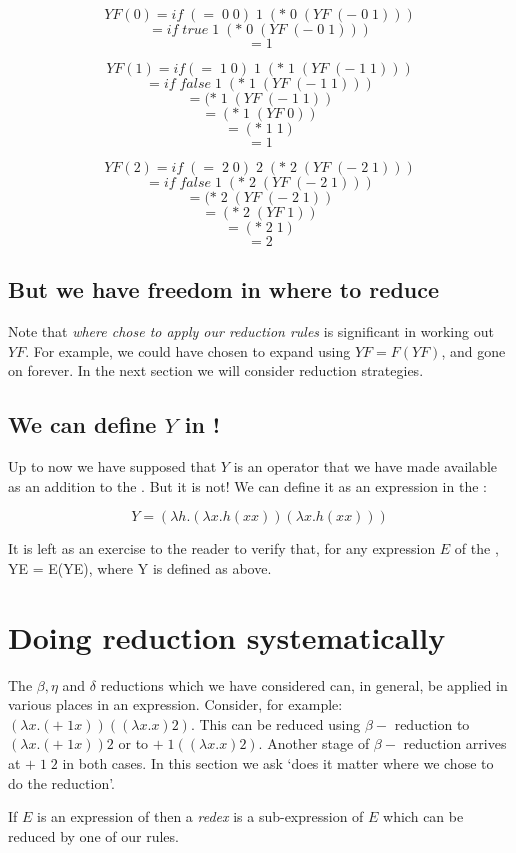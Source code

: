 $$YF(0) =  if\;(=\;0\;0)\;1\;(*\;0\;(YF\;(-\;0\;1)))$$
$$  =    if\;true\;1\;(*\;0\;(YF\;(-\;0\;1)))$$
$$ = 1 $$


$$YF(1) =  if (=\;1\;0)\;1\;(*\;1\;(YF\;(-\;1\;1)))$$
$$  =    if\;false\;1\;(*\;1\;(YF\;(-\;1\;1)))$$
$$ =      (*\;1\;(YF\;(-\;1\;1)) $$
$$ =      (*\;1\;(YF\;0)) $$
$$ =      (*\;1\;1) $$
$$ =        1 $$


$$YF(2) =  if\;(=\;2\;0)\;2\;(*\;2\;(YF\;(-\;2\;1)))$$
$$  =    if\;false\;1\;(*\;2\;(YF\;(-\;2\;1)))$$
$$ =      (*\;2\;(YF\;(-\;2\;1)) $$
$$ =      (*\;2\;(YF\;1)) $$
$$ =      (*\;2\;1) $$
$$ =        2 $$

\subsection{But we have freedom in where to reduce}
Note that {\em where chose to apply our reduction rules} is significant
in working out $YF$. For example, we could have chosen to expand using
$YF = F(YF)$, and gone on forever. In the next section we will consider
reduction strategies.

\subsection{We can define $Y$ in \LC!}
Up to now we have supposed that $Y$ is an operator that we have made
available as an addition to the \LC. But it is not! We can define it as an
expression in the \LC:

$$ Y = (\lambda h. (\lambda x.h (x x)) (\lambda x.h (x x)))$$

It is left as an exercise to the reader to verify that, for any expression
$E$ of the \LC, YE = E(YE), where Y is defined as above.


\section{Doing reduction systematically}

The $\beta, \eta$ and $\delta$ reductions which we have considered can,
in general, be applied in various places in an expression. Consider, for
example: $(\lambda x.(+\;1 x))((\lambda x.x)2)$. This can be reduced using
$\beta-$ reduction to $(\lambda x.(+\;1 x))2$ or to $+\;1 ((\lambda
x.x)2)$. Another stage of  $\beta-$ reduction arrives at $+\;1\; 2$ in
both cases.  In this section we ask `does it matter where we chose to do
the reduction'.

If $E$ is an expression of \LC then a {\em redex} is a
sub-expression of $E$ which can be reduced by one of our rules.

